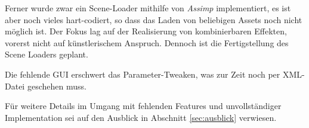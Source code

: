   	Ferner wurde zwar ein Scene-Loader mithilfe von \emph{Assimp} implementiert, es ist aber noch vieles
  	hart-codiert, so dass das Laden von beliebigen Assets noch nicht möglich ist. Der Fokus lag
  	auf der Realisierung von kombinierbaren Effekten, vorerst nicht auf künstlerischem Anspruch. 
  	Dennoch ist die Fertigstellung des Scene Loaders geplant.
	
	Die fehlende GUI erschwert das Parameter-Tweaken, was zur Zeit noch per XML-Datei geschehen muss.
	
	Für weitere Details im Umgang mit fehlenden Features und unvollständiger Implementation sei auf
	den Ausblick in Abschnitt \ref{sec:ausblick} verwiesen.

\clearpage
